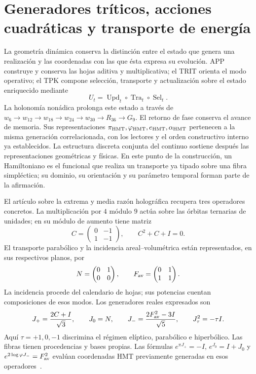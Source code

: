 \section{Generadores tríticos, acciones cuadráticas y transporte de energía}
\label{sec:hamiltonianos-curvatura}

La geometría dinámica conserva la distinción entre el estado que genera una
realización y las coordenadas con las que ésta expresa su evolución. APP
construye y conserva las hojas aditiva y multiplicativa; el TRIT orienta el
modo operativo; el TPK compone selección, transporte y actualización sobre
el estado enriquecido mediante
\[
 U_t=\operatorname{Upd}_t\circ\operatorname{Tra}_t\circ
 \operatorname{Sel}_t.
\]
La holonomía nonádica prolonga este estado a través de
\(w_6\to w_{12}\to w_{18}\to w_{24}\to w_{30}\to R_{36}\to G_9\).
El retorno de fase conserva el avance de memoria. Sus representaciones
\(\pi_{\rm HMT},\varphi_{\rm HMT},e_{\rm HMT},\alpha_{\rm HMT}\)
pertenecen a la misma generación correlacionada, con los lectores y el
orden constructivo interno ya establecidos. La estructura discreta conjunta
del continuo sostiene después las representaciones geométricas y físicas.
En este punto de la construcción, un Hamiltoniano es el funcional que
realiza un transporte ya tipado sobre una fibra simpléctica; su dominio,
su orientación y su parámetro temporal forman parte de la afirmación.

El artículo sobre la extrema y media razón holográfica recupera tres
operadores concretos. La multiplicación por \(4\) módulo \(9\) actúa sobre
las órbitas ternarias de unidades; en su módulo de aumento tiene matriz
\[
 C=\begin{pmatrix}0&-1\\1&-1\end{pmatrix},\qquad C^2+C+I=0.
\]
El transporte parabólico y la incidencia areal--volumétrica están
representados, en sus respectivos planos, por
\[
 N=\begin{pmatrix}0&1\\0&0\end{pmatrix},\qquad
 F_{\rm av}=\begin{pmatrix}0&1\\1&1\end{pmatrix}.
\]
La incidencia procede del calendario de hojas; sus potencias cuentan
composiciones de esos modos. Los generadores reales expresados son
\begin{equation}
 J_+=\frac{2C+I}{\sqrt3},\qquad J_0=N,\qquad
 J_-=\frac{2F_{\rm av}^{2}-3I}{\sqrt5},\qquad
 J_\tau^2=-\tau I.
 \label{eq:hc-generadores}
\end{equation}
Aquí \(\tau=+1,0,-1\) discrimina el régimen elíptico, parabólico e
hiperbólico. Las fibras tienen procedencias y bases propias. Las fórmulas
\(e^{\pi J_+}=-I\), \(e^{J_0}=I+J_0\) y
\(e^{2\log\varphi J_-}=F_{\rm av}^{2}\) evalúan coordenadas HMT
previamente generadas en esos operadores~\cite{hmtX}.

